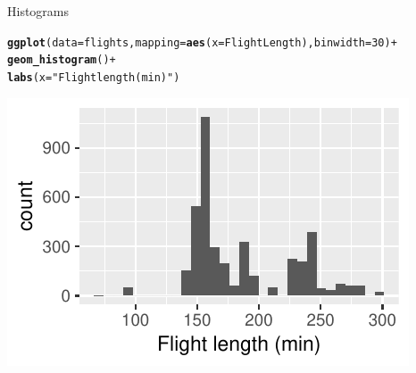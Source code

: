 \documentclass[10pt]{beamer}\usepackage[]{graphicx}\usepackage[]{color}
\makeatletter
\def\maxwidth{ %
  \ifdim\Gin@nat@width>\linewidth
    \linewidth
  \else
    \Gin@nat@width
  \fi
}
\newcommand{\hlnum}[1]{\textcolor[rgb]{0.686,0.059,0.569}{#1}}%
\newcommand{\hlstr}[1]{\textcolor[rgb]{0.192,0.494,0.8}{#1}}%
\newcommand{\hlopt}[1]{\textcolor[rgb]{0,0,0}{#1}}%
\newcommand{\hlstd}[1]{\textcolor[rgb]{0.345,0.345,0.345}{#1}}%
\newcommand{\hlkwc}[1]{\textcolor[rgb]{0.333,0.667,0.333}{#1}}%
\newcommand{\hlkwd}[1]{\textcolor[rgb]{0.737,0.353,0.396}{\textbf{#1}}}%
\newenvironment{kframe}{%
 \def\at@end@of@kframe{}%
 \ifinner\ifhmode%
  \def\at@end@of@kframe{\end{minipage}}%
  \begin{minipage}{\columnwidth}%
 \fi\fi%
 \def\FrameCommand##1{\hskip\@totalleftmargin \hskip-\fboxsep
 \colorbox{shadecolor}{##1}\hskip-\fboxsep
     \hskip-\linewidth \hskip-\@totalleftmargin \hskip\columnwidth}%
 \MakeFramed {\advance\hsize-\width
   \@totalleftmargin\z@ \linewidth\hsize
   \@setminipage}}%
 {\par\unskip\endMakeFramed%
 \at@end@of@kframe}
\newenvironment{knitrout}{}{} %
\makeatother
\begin{document}
\begin{frame}[fragile]{Histograms}

\begin{knitrout}\small
{}\color{fgcolor}\begin{kframe}
\begin{alltt}
\hlkwd{ggplot}\hlstd{(}\hlkwc{data} \hlstd{= flights,} \hlkwc{mapping} \hlstd{=} \hlkwd{aes}\hlstd{(}\hlkwc{x} \hlstd{= FlightLength),} \hlkwc{binwidth} \hlstd{=} \hlnum{30}\hlstd{)} \hlopt{+}
  \hlkwd{geom_histogram}\hlstd{()} \hlopt{+}
  \hlkwd{labs}\hlstd{(}\hlkwc{x} \hlstd{=} \hlstr{"Flight length (min)"}\hlstd{)}
\end{alltt}
\end{kframe}
\includegraphics[width=\maxwidth]{figure/unnamed-chunk-17-1} 

\end{knitrout}

\end{frame}
\end{document}
